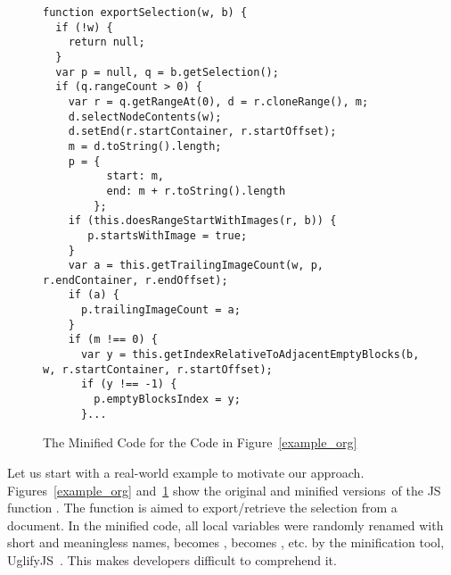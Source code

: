 \begin{figure}[t]
	\centering
	\begin{lstlisting}[]
function exportSelection(w, b) {
  if (!w) {
    return null;
  }
  var p = null, q = b.getSelection();
  if (q.rangeCount > 0) {
    var r = q.getRangeAt(0), d = r.cloneRange(), m;
    d.selectNodeContents(w);
    d.setEnd(r.startContainer, r.startOffset);
    m = d.toString().length;
    p = {
          start: m,
          end: m + r.toString().length
        };
    if (this.doesRangeStartWithImages(r, b)) {
       p.startsWithImage = true;
    }
    var a = this.getTrailingImageCount(w, p, r.endContainer, r.endOffset);
    if (a) {
      p.trailingImageCount = a;
    }
    if (m !== 0) {
      var y = this.getIndexRelativeToAdjacentEmptyBlocks(b, w, r.startContainer, r.startOffset);
      if (y !== -1) {
        p.emptyBlocksIndex = y;
      }...
\end{lstlisting}
\vspace{-12pt}
\caption{The Minified Code for the Code in Figure~\ref{example_org}}
\label{example_sim}
\end{figure}

Let us start with a real-world example to motivate our approach.
Figures~\ref{example_org} and~\ref{example_sim} show the original and
minified versions~of the JS function .  The
function is aimed to export/retrieve the selection from a document.
%
In the minified code, all local variables were randomly renamed with
short and meaningless names, \eg {} becomes ,
 becomes , etc. by the minification tool,
\eg UglifyJS~\cite{uglify}. This makes developers difficult to
comprehend it.


%


%
%

